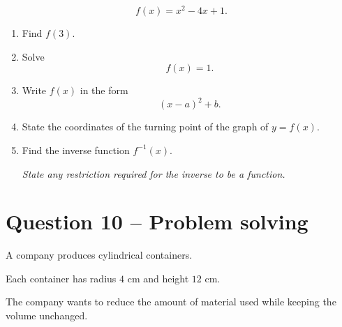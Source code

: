 	\[
	f(x)=x^2-4x+1.
	\]
	
	\begin{enumerate}
		
		\item[(a)]
		Find \(f(3)\).
		
		\vspace{15mm}
		
		\item[(b)]
		Solve
		\[
		f(x)=1.
		\]
		
		\vspace{20mm}
		
		\item[(c)]
		Write \(f(x)\) in the form
		\[
		(x-a)^2+b.
		\]
		
		\vspace{20mm}
		
		\item[(d)]
		State the coordinates of the turning point of the graph of \(y=f(x)\).
		
		\vspace{15mm}
		
		\item[(e)]
		Find the inverse function \(f^{-1}(x)\).
		
		\textit{State any restriction required for the inverse to be a function.}
		
	\end{enumerate}
	
	\newpage
	
	\section*{Question 10 -- Problem solving }
	
	A company produces cylindrical containers.
	
	Each container has radius \(4\) cm and height \(12\) cm.
	
	The company wants to reduce the amount of material used while keeping the volume unchanged.
	
